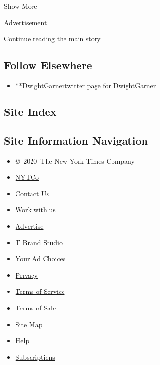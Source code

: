 Show More

Advertisement

\protect\hyperlink{after-mid2}{Continue reading the main story}

\hypertarget{follow-elsewhere}{%
\subsection{Follow Elsewhere}\label{follow-elsewhere}}

\begin{itemize}
\tightlist
\item
  \href{https://twitter.com/DwightGarner}{**DwightGarnertwitter page for
  DwightGarner}
\end{itemize}

\hypertarget{site-index}{%
\subsection{Site Index}\label{site-index}}

\hypertarget{site-information-navigation}{%
\subsection{Site Information
Navigation}\label{site-information-navigation}}

\begin{itemize}
\tightlist
\item
  \href{https://help.nytimes3xbfgragh.onion/hc/en-us/articles/115014792127-Copyright-notice}{©~2020~The
  New York Times Company}
\end{itemize}

\begin{itemize}
\tightlist
\item
  \href{https://www.nytco.com/}{NYTCo}
\item
  \href{https://help.nytimes3xbfgragh.onion/hc/en-us/articles/115015385887-Contact-Us}{Contact
  Us}
\item
  \href{https://www.nytco.com/careers/}{Work with us}
\item
  \href{https://nytmediakit.com/}{Advertise}
\item
  \href{http://www.tbrandstudio.com/}{T Brand Studio}
\item
  \href{https://www.nytimes3xbfgragh.onion/privacy/cookie-policy\#how-do-i-manage-trackers}{Your
  Ad Choices}
\item
  \href{https://www.nytimes3xbfgragh.onion/privacy}{Privacy}
\item
  \href{https://help.nytimes3xbfgragh.onion/hc/en-us/articles/115014893428-Terms-of-service}{Terms
  of Service}
\item
  \href{https://help.nytimes3xbfgragh.onion/hc/en-us/articles/115014893968-Terms-of-sale}{Terms
  of Sale}
\item
  \href{https://spiderbites.nytimes3xbfgragh.onion}{Site Map}
\item
  \href{https://help.nytimes3xbfgragh.onion/hc/en-us}{Help}
\item
  \href{https://www.nytimes3xbfgragh.onion/subscription?campaignId=37WXW}{Subscriptions}
\end{itemize}
